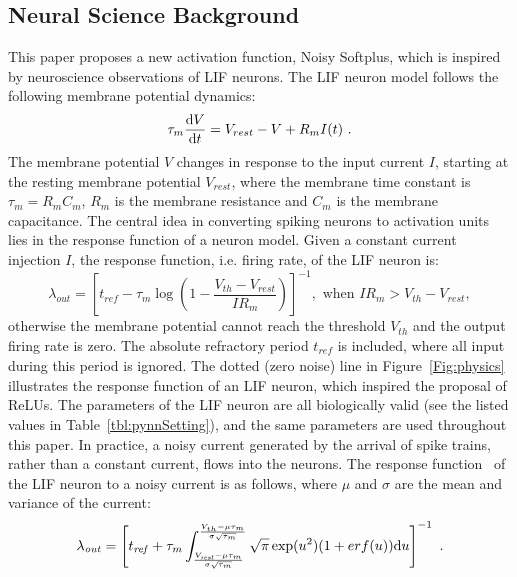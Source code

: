 \subsection{Neural Science Background}
	This paper proposes a new activation function, Noisy Softplus, which is inspired by neuroscience observations of LIF neurons.
	The LIF neuron model follows the following membrane potential dynamics:
	\begin{equation}
	\tau_m \frac{\mathrm{d} V}{\mathrm{d} t}=V_{rest} - V + R_{m} I(t) ~.
	\label{eq:LIF_V}
	\end{equation}
	The membrane potential $V$ changes in response to the input current $I$, starting at the resting membrane potential $V_{rest}$, where the membrane time constant is $\tau_m = R_mC_m$, $R_m$ is the membrane resistance and $C_m$ is the membrane capacitance.
	The central idea in converting spiking neurons to activation units lies in the response function of a neuron model.
	Given a constant current injection $I$, the response function, i.e. firing rate, of the LIF neuron is:
	\begin{equation}
	\lambda_\mathit{out}=
	\left [ t_\mathit{ref}-\tau_m\log \left ( 1-\frac{V_{th}-V_\mathit{rest}}{IR_m}  \right )\right ]^{-1}, \textrm{~when~} IR_m>V_{th}-V_{rest},
	\label{equ:consI}
	\end{equation}
	otherwise the membrane potential cannot reach the threshold $V_{th}$ and the output firing rate is zero. 
	The absolute refractory period $t_\mathit{ref}$ is included, where all input during this period is ignored.
	The dotted (zero noise) line in Figure~\ref{Fig:physics} illustrates the response function of an LIF neuron, which inspired the proposal of ReLUs.
	The parameters of the LIF neuron are all biologically valid (see the listed values in Table~\ref{tbl:pynnSetting}), and the same parameters are used throughout this paper.
	In practice, a noisy current generated by the arrival of spike trains, rather than a constant current, flows into the neurons.
	The response function~\cite{la2008response}	of the LIF neuron to a noisy current is as follows, where $\mu$ and $\sigma$ are the mean and variance of the current:
	\begin{equation}
	\lambda_\mathit{out}=
	\left [ t_\mathit{ref}+\tau_m \int_{\frac{V_\mathit{rest}-\mu \tau_m }{\sigma \sqrt{\tau_m}}}^{\frac{V_{th}-\mu \tau_m }{\sigma \sqrt{\tau_m}}} \sqrt{\pi} \exp(u^{2}) (1+erf(u)) \mathrm{d} u \right ]^{-1} ~.
	\label{equ:noiseI}
	\end{equation}
	
